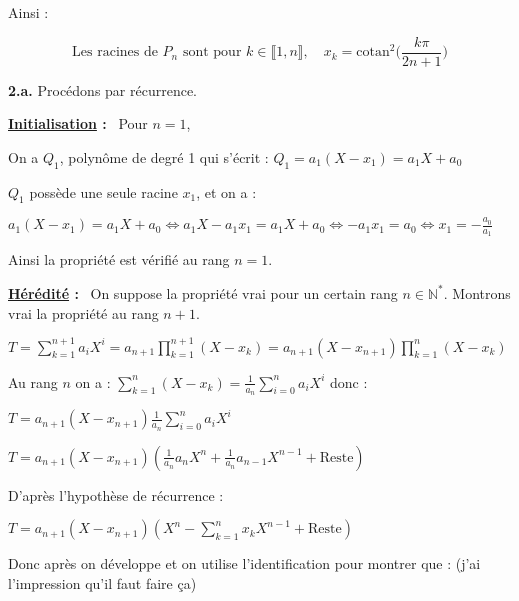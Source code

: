 \documentclass[11pt]{article}
\newcommand{\bfrac}[2]{\displaystyle\frac{#1}{#2}}
\newcommand{\N}{\mathbb{N}}
\newcommand{\cotan}{\text{cotan}}
\begin{document}
\vspace{20px}

\noindent Ainsi :

\vspace{-37px}

\[\boxed{\; \text{Les racines de $P_n$ sont pour $k \in \llbracket 1,n \rrbracket, \quad x_k = \cotan^2\Bigg(\bfrac{k\pi}{2n+1}\Bigg)$} \;} \]

\vspace{10px}

\textbf{2.a.} Procédons par récurrence.

\vspace{5px}

\noindent \textbf{\underline{Initialisation} :} \, Pour $n = 1$,

\noindent On a $Q_1$, polynôme de degré 1 qui s'écrit : $Q_1 = a_1(X-x_1) = a_1 X + a_0$

\noindent $Q_1$ possède une seule racine $x_1$, et on a :

$a_1(X-x_1) = a_1 X + a_0 \Leftrightarrow a_1X-a_1x_1 = a_1 X + a_0 \Leftrightarrow -a_1 x_1 = a_0 \Leftrightarrow x_1 = -\bfrac{a_0}{a_1}$

\noindent Ainsi la propriété est vérifié au rang $n = 1$.

\vspace{5px}

\noindent \textbf{\underline{Hérédité} :} \, On suppose la propriété vrai pour un certain rang $n \in \N^*$. Montrons vrai la propriété au rang $n+1$.

$T = \displaystyle\sum_{k=1}^{n+1} a_i X^i = a_{n+1} \prod^{n+1}_{k=1}(X-x_k) = a_{n+1}(X-x_{n+1})\prod^n_{k=1} (X-x_k)$

Au rang $n$ on a : $\displaystyle\sum_{k=1}^n(X-x_k) = \bfrac{1}{a_n}\sum_{i=0}^na_i X^i$ donc :

$T = a_{n+1}(X-x_{n+1})\bfrac{1}{a_n}\sum_{i=0}^na_i X^i$

$T = a_{n+1}(X-x_{n+1})(\bfrac{1}{a_n} a_n X^n + \bfrac{1}{a_n} a_{n-1} X^{n-1} + \text{Reste})$

\vspace{5px}
\noindent D'après l'hypothèse de récurrence :

\vspace{5px}
$T = a_{n+1}(X-x_{n+1})(X^n - \displaystyle\sum_{k=1}^n x_k X^{n-1} + \text{Reste})$

\vspace{2px}
\noindent Donc après on développe et on utilise l'identification pour montrer que : (j'ai l'impression qu'il faut faire ça)
\end{document}
